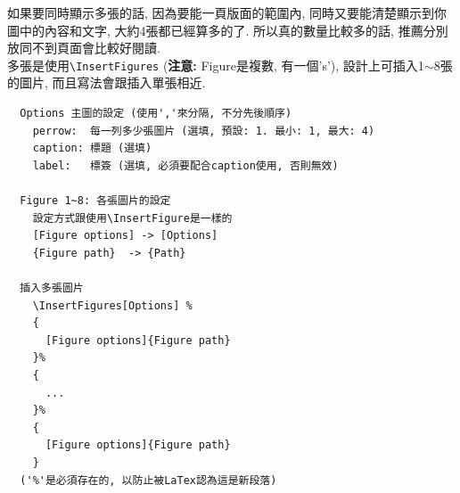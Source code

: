 \newpage
{}

  如果要同時顯示多張的話, 因為要能一頁版面的範圍內, 同時又要能清楚顯示到你圖中的內容和文字, 大約4張都已經算多的了. 所以真的數量比較多的話, 推薦分別放同不到頁面會比較好閱讀.\\

  多張是使用\verb|\InsertFigures| ({\bf 注意:} Figure是複數, 有一個's'), 設計上可插入1$\sim$8張的圖片, 而且寫法會跟插入單張相近.

  \EmptyLine
  \begin{fmpage}{\textwidth}
  \begin{verbatim}
  Options 主圖的設定 (使用','來分隔, 不分先後順序)
    perrow:  每一列多少張圖片 (選填, 預設: 1. 最小: 1, 最大: 4)
    caption: 標題 (選填)
    label:   標簽 (選填, 必須要配合caption使用, 否則無效)

  Figure 1~8: 各張圖片的設定
    設定方式跟使用\InsertFigure是一樣的
    [Figure options] -> [Options]
    {Figure path}  -> {Path}

  插入多張圖片
    \InsertFigures[Options] %
    {
      [Figure options]{Figure path}
    }%
    {
      ...
    }%
    {
      [Figure options]{Figure path}
    }
  ('%'是必須存在的, 以防止被LaTex認為這是新段落)
  \end{verbatim}
  \end{fmpage}

  \newpage

